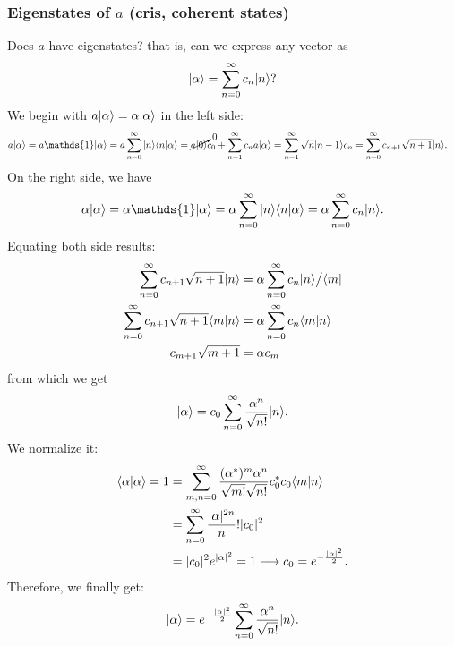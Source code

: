 \subsubsection{Eigenstates of $a$ (cris, coherent states)}
Does $a$ have eigenstates? that is, can we express any vector as 
\begin{align*}
    |\alpha\rangle=\sum_{n=0}^\infty c_n|n\rangle?
\end{align*}
We begin with $a|\alpha\rangle=\alpha|\alpha\rangle$ in the left side:
\begin{align*}
    a\ket{\alpha}&=a\mathds{1}\ket{\alpha}=a\sum_{n=0}^\infty\ket{n}\braket{n|\alpha}=\cancelto{0}{a\ket{0}}c_0+\sum_{n=1}^\infty c_na\ket{\alpha}=\sum_{n=1}^\infty\sqrt{n}\ket{n-1}c_n=\sum_{n=0}^\infty c_{n+1}\sqrt{n+1}\ket{n}.
\end{align*}
On the right side, we have 
\begin{align*}
    \alpha\ket{\alpha}=\alpha\mathds{1}\ket{\alpha}=\alpha\sum_{n=0}^\infty \ket{n}\braket{n|\alpha}=\alpha\sum_{n=0}^\infty c_n\ket{n}.
\end{align*}
Equating both side results:
\begin{align*}
    \sum_{n=0}^\infty c_{n+1}\sqrt{n+1}|n\rangle&=\alpha\sum_{n=0}^\infty c_n|n\rangle\bigr/\langle m|\\
    \sum_{n=0}^\infty c_{n+1}\sqrt{n+1}\langle m|n\rangle&=\alpha\sum_{n=0}^\infty c_n\langle m|n\rangle\\
    c_{m+1}\sqrt{m+1}&=\alpha c_m
\end{align*}
from which we get 
\begin{align*}
    |\alpha\rangle=c_0\sum_{n=0}^\infty \frac{\alpha^n}{\sqrt{n!}}|n\rangle.
\end{align*}
We normalize it:
\begin{align*}
    \langle\alpha|\alpha\rangle=1&=\sum_{m,n=0}^\infty \frac{(\alpha^*)^m\alpha^n}{\sqrt{m!}\sqrt{n!}}c_0^*c_0\langle m|n\rangle\\
    &=\sum_{n=0}^\infty \frac{|\alpha|^{2n}}n!|c_0|^2\\
    &=|c_0|^2e^{|\alpha|^2}=1\longrightarrow c_0=e^{-\frac{|\alpha|^2}{2}}.
\end{align*}
Therefore, we finally get:
\begin{align}
    |\alpha\rangle=e^{-\frac{|\alpha|^2}{2}}\sum_{n=0}^\infty \frac{\alpha^n}{\sqrt{n!}}|n\rangle.
\end{align}
%
